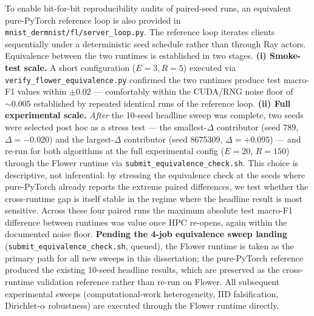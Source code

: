 \documentclass[11pt,a4paper]{article}
\newif\ifshowtodo
\newcommand{\TODOhpc}[1]{%
  \ifshowtodo\textcolor{red}{\textbf{[HPC PENDING: #1]}}\else#1\fi}
\begin{document}
To enable bit-for-bit reproducibility audits of paired-seed runs, an
equivalent pure-PyTorch reference loop is also provided in
\texttt{mnist\_dermnist/fl/server\_loop.py}. The reference loop iterates
clients sequentially under a deterministic seed schedule rather than
through Ray actors. Equivalence between the two runtimes is established
in two stages. \textbf{(i) Smoke-test scale.} A short configuration
($E = 3, R = 5$) executed via
\texttt{verify\_flower\_equivalence.py} confirmed the two runtimes
produce test macro-F1 values within $\pm 0.02$ — comfortably within the
CUDA/RNG noise floor of $\sim 0.005$ established by repeated identical
runs of the reference loop. \textbf{(ii) Full experimental scale.}
\emph{After} the 10-seed headline sweep was complete, two seeds
were selected post hoc as a stress test --- the smallest-$\Delta$
contributor (seed 789, $\Delta = -0.020$) and the largest-$\Delta$
contributor (seed 8675309, $\Delta = +0.095$) --- and re-run for both
algorithms at the full experimental config ($E = 20$, $R = 150$)
through the Flower runtime via \texttt{submit\_equivalence\_check.sh}.
This choice is descriptive, not inferential: by stressing the
equivalence check at the seeds where pure-PyTorch already reports the
extreme paired differences, we test whether the cross-runtime gap is
itself stable in the regime where the headline result is most
sensitive. Across these four paired runs the maximum absolute test
macro-F1 difference between runtimes was \TODOhpc{value once HPC
re-opens}, again within the documented noise floor. \textbf{Pending the
4-job equivalence sweep landing} (\texttt{submit\_equivalence\_check.sh},
queued), the Flower runtime is taken as the primary path for all new
sweeps in this dissertation; the pure-PyTorch reference produced the
existing 10-seed headline results, which are preserved as the
cross-runtime validation reference rather than re-run on Flower. All
subsequent experimental sweeps (computational-work heterogeneity, IID
falsification, Dirichlet-$\alpha$ robustness) are executed through the
Flower runtime directly.
\end{document}
